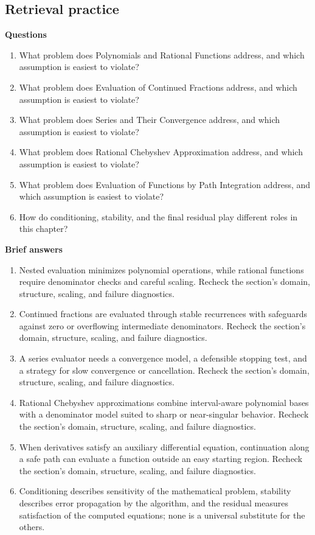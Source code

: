 \documentclass[10pt,letterpaper]{article}
\begin{document}
\subsection*{Retrieval practice}
\textbf{Questions}
\begin{enumerate}
\item What problem does Polynomials and Rational Functions address, and which assumption is easiest to violate?
\item What problem does Evaluation of Continued Fractions address, and which assumption is easiest to violate?
\item What problem does Series and Their Convergence address, and which assumption is easiest to violate?
\item What problem does Rational Chebyshev Approximation address, and which assumption is easiest to violate?
\item What problem does Evaluation of Functions by Path Integration address, and which assumption is easiest to violate?
\item How do conditioning, stability, and the final residual play different roles in this chapter?
\end{enumerate}

\textbf{Brief answers}
\begin{enumerate}
\item Nested evaluation minimizes polynomial operations, while rational functions require denominator checks and careful scaling. Recheck the section's domain, structure, scaling, and failure diagnostics.
\item Continued fractions are evaluated through stable recurrences with safeguards against zero or overflowing intermediate denominators. Recheck the section's domain, structure, scaling, and failure diagnostics.
\item A series evaluator needs a convergence model, a defensible stopping test, and a strategy for slow convergence or cancellation. Recheck the section's domain, structure, scaling, and failure diagnostics.
\item Rational Chebyshev approximations combine interval-aware polynomial bases with a denominator model suited to sharp or near-singular behavior. Recheck the section's domain, structure, scaling, and failure diagnostics.
\item When derivatives satisfy an auxiliary differential equation, continuation along a safe path can evaluate a function outside an easy starting region. Recheck the section's domain, structure, scaling, and failure diagnostics.
\item Conditioning describes sensitivity of the mathematical problem, stability describes error propagation by the algorithm, and the residual measures satisfaction of the computed equations; none is a universal substitute for the others.
\end{enumerate}
\end{document}
